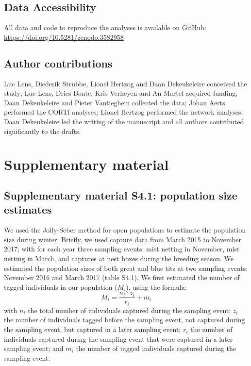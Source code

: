 \documentclass[10pt, twoside]{book} %
\begin{document}
	\subsection*{Data Accessibility}
	
All data and code to reproduce the analyses is available on GitHub: \url{https://doi.org/10.5281/zenodo.3582958}


	
	\subsection*{Author contributions}
Luc Lens, Diederik Strubbe, Lionel Hertzog and Daan Dekeukeleire conceived the study; Luc Lens, Dries Bonte, Kris Verheyen and An Martel acquired funding; Daan Dekeukeleire and Pieter Vantieghem collected the data; Johan Aerts performed the CORTf analyses; Lionel Hertzog performed the network analyses; Daan Dekeukeleire led the writing of the manuscript and all authors contributed significantly to the drafts. \\

\clearpage	
	\section{Supplementary material}
	
	\subsection*{Supplementary material S4.1: population size estimates}
	
We used the Jolly-Seber method for open populations \citep{Jolly1965, Seber1965} to estimate the population size during winter. Briefly, we used capture data from March 2015 to November 2017; with for each year three sampling events: mist netting in November, mist netting in March, and captures at nest boxes during the breeding season. We estimated the population sizes of both great and blue tits at two sampling events: November 2016 and March 2017 (table S4.1). We first estimated the number of tagged individuals in our population ($M_i$), using the formula:\\
\begin{equation*}
	M_i = \frac{n_i \cdot z_i}{r_i} + m_i
\end{equation*}	
with $n_i$ the total number of individuals captured during the sampling event; $z_i$ the number of individuals tagged before the sampling event, not captured during the sampling event, but captured in a later sampling event; $r_i$ the number of individuals captured during the sampling event that were captured in a later sampling event; and $m_i$ the number of tagged individuals captured during the sampling event.\\
\end{document}
